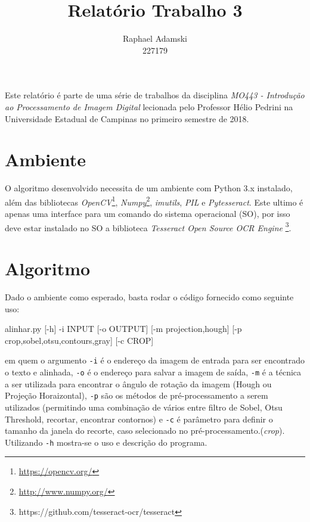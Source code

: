 \documentclass[10pt,twocolumn,letterpaper]{article}
\begin{document}
\title{Relatório Trabalho 3}
\author{Raphael Adamski \\227179}

\maketitle
Este relatório é parte de uma série de trabalhos da disciplina \emph{MO443 - Introdução ao Processamento de Imagem Digital} lecionada pelo Professor Hélio Pedrini na Universidade Estadual de Campinas no primeiro semestre de 2018.

\section{Ambiente}
O algoritmo desenvolvido necessita de um ambiente com Python 3.x instalado, além das bibliotecas \emph{OpenCV}\footnote{\url{https://opencv.org/}}, \emph{Numpy}\footnote{\url{http://www.numpy.org/}}, \emph{imutils}, \emph{PIL} e \emph{Pytesseract}. Este ultimo é apenas uma interface para um comando do sistema operacional (SO), por isso deve estar instalado no SO a biblioteca \emph{Tesseract Open Source OCR Engine }\footnote{https://github.com/tesseract-ocr/tesseract}.

\section{Algoritmo}

Dado o ambiente como esperado, basta rodar o código fornecido como seguinte uso:\\
\begin{numVblock}
alinhar.py [-h] -i INPUT [-o OUTPUT]
[-m {projection,hough}]
[-p {crop,sobel,otsu,contours,gray}]
[-c CROP]
\end{numVblock}
em quem o argumento \texttt{-i} é o endereço da imagem de entrada para ser encontrado o texto e alinhada, \texttt{-o} é o endereço para salvar a imagem de saída, \texttt{-m} é a técnica a ser utilizada para encontrar o ângulo de rotação da imagem (Hough ou Projeção Horaizontal), \texttt{-p} são os métodos de pré-processamento a serem utilizados (permitindo uma combinação de vários entre filtro de Sobel, Otsu Threshold, recortar, encontrar contornos) e \texttt{-c} é parâmetro para definir o tamanho da janela do recorte, caso selecionado no pré-processamento.(\emph{crop}). Utilizando \texttt{-h} mostra-se o uso e descrição do programa.\\
\end{document}
